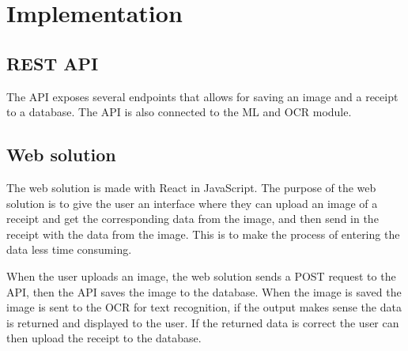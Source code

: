 \cleardoublepage
\chapter{Implementation }
\label{chap:implementation}

\section{REST API}\label{sec:REST API}

The API exposes several endpoints that allows for saving an image and a receipt to a database.
The API is also connected to the ML and OCR module.

\section{Web solution}\label{sec:Web solution}

The web solution is made with React in JavaScript.
The purpose of the web solution is to give the user an interface where they can upload an image of a receipt and get
the corresponding data from the image, and then send in the receipt with the data from the image.
This is to make the process of entering the data less time consuming.

When the user uploads an image, the web solution sends a POST request to the API, then the API saves the image to
the database.
When the image is saved the image is sent to the OCR for text recognition, if the output makes sense the data is
returned and displayed to the user.
If the returned data is correct the user can then upload the receipt to the database.

